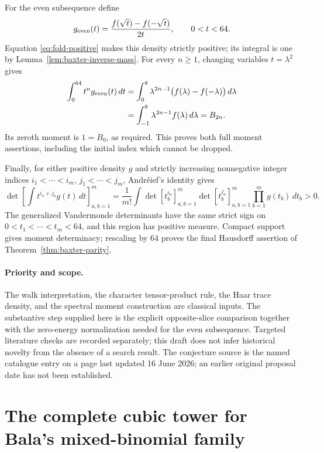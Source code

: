 \documentclass[11pt,a4paper]{article}
\theoremstyle{remark}\newtheorem{remark}[theorem]{Remark}
\numberwithin{equation}{section}
\begin{document}
For the even subsequence define
\begin{equation}\label{eq:baxter-even-density}
 g_{\rm even}(t)=\frac{f(\sqrt t)-f(-\sqrt t)}{2t},
 \qquad 0<t<64.
\end{equation}
Equation \eqref{eq:fold-positive} makes this density strictly positive;
its integral is one by Lemma~\ref{lem:baxter-inverse-mass}. For every
$n\ge1$, changing variables $t=\lambda^2$ gives
\begin{align*}
 \int_0^{64}t^ng_{\rm even}(t)\,dt
 &=\int_0^8\lambda^{2n-1}\bigl(f(\lambda)-f(-\lambda)\bigr)\,d\lambda\\
 &=\int_{-1}^8\lambda^{2n-1}f(\lambda)\,d\lambda
 =B_{2n}.
\end{align*}
Its zeroth moment is $1=B_0$, as required. This proves both full moment
assertions, including the initial index which cannot be dropped.

Finally, for either positive density $g$ and strictly increasing
nonnegative integer indices $i_1<\cdots<i_m$,
$j_1<\cdots<j_m$, Andr\'eief's identity gives
\[
 \det\left[\int t^{i_a+j_b}g(t)\,dt\right]_{a,b=1}^m
 =\frac1{m!}\int
 \det[t_b^{i_a}]_{a,b=1}^m
 \det[t_b^{j_a}]_{a,b=1}^m\prod_{b=1}^m g(t_b)\,dt_b>0.
\]
The generalized Vandermonde determinants have the same strict sign on
$0<t_1<\cdots<t_m<64$, and this region has positive measure. Compact
support gives moment determinacy; rescaling by $64$ proves the final
Hausdorff assertion of Theorem~\ref{thm:baxter-parity}.

\paragraph{Priority and scope.}
The walk interpretation, the character tensor-product rule, the Haar
trace density, and the spectral moment construction are classical
inputs. The substantive step supplied here is the explicit opposite-slice
comparison together with the zero-energy normalization needed for the
even subsequence. Targeted literature checks are recorded separately;
this draft does not infer historical novelty from the absence of a
search result. The conjecture source is the named catalogue entry on a
page last updated 16 June 2026; an earlier original proposal date has
not been established.

\section{The complete cubic tower for Bala's mixed-binomial family}
\end{document}
